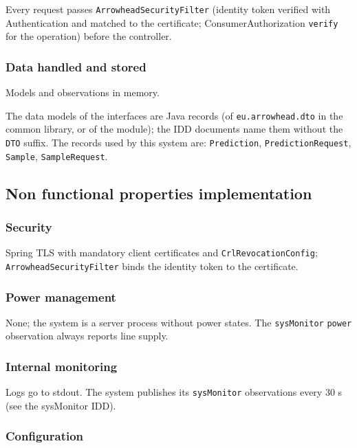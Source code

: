 \documentclass[a4paper]{arrowhead}
\begin{document}
Every request passes \texttt{Arrowhead\allowbreak{}Security\allowbreak{}Filter} (identity token verified with Authentication and matched to the certificate; Consumer\allowbreak{}Authorization \texttt{verify} for the operation) before the controller.

\subsubsection{Data handled and stored}

Models and observations in memory.

The data models of the interfaces are Java records (of \texttt{eu.arrowhead.dto} in the common library, or of the module); the IDD documents name them without the \texttt{DTO} suffix. The records used by this system are: \texttt{Prediction}, \texttt{PredictionRequest}, \texttt{Sample}, \texttt{SampleRequest}.

\subsection{Non functional properties implementation}

\subsubsection{Security}

Spring TLS with mandatory client certificates and \texttt{Crl\allowbreak{}Revocation\allowbreak{}Config}; \texttt{Arrowhead\allowbreak{}Security\allowbreak{}Filter} binds the identity token to the certificate.

\subsubsection{Power management}

None; the system is a server process without power states. The \texttt{sysMonitor} \texttt{power} observation always reports line supply.

\subsubsection{Internal monitoring}

Logs go to stdout. The system publishes its \texttt{sysMonitor} observations every 30 s (see the sysMonitor IDD).

\subsubsection{Configuration}
\end{document}

